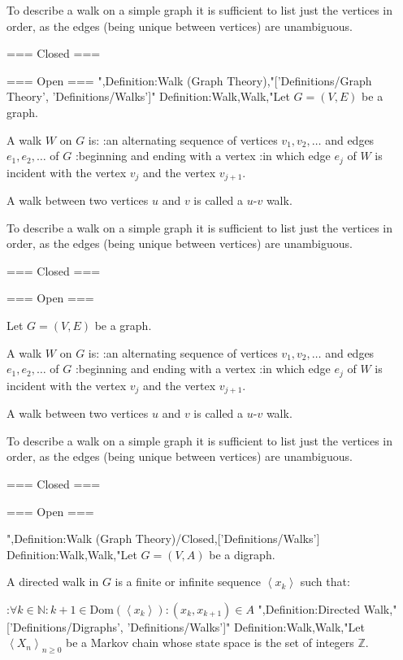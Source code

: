 To describe a walk on a simple graph it is sufficient to list just the vertices in order, as the edges (being unique between vertices) are unambiguous.


=== Closed ===

=== Open ===
",Definition:Walk (Graph Theory),"['Definitions/Graph Theory', 'Definitions/Walks']"
Definition:Walk,Walk,"Let $G = \left( V, E \right)$ be a graph.

A walk $W$ on $G$ is:
:an alternating sequence of vertices $v_1, v_2, \ldots$ and edges $e_1, e_2, \ldots$ of $G$
:beginning and ending with a vertex
:in which edge $e_j$ of $W$ is incident with the vertex $v_j$ and the vertex $v_{j + 1}$.


A walk between two vertices $u$ and $v$ is called a $u$-$v$ walk.


To describe a walk on a simple graph it is sufficient to list just the vertices in order, as the edges (being unique between vertices) are unambiguous.


=== Closed ===

=== Open ===

Let $G = \left( V, E \right)$ be a graph.

A walk $W$ on $G$ is:
:an alternating sequence of vertices $v_1, v_2, \ldots$ and edges $e_1, e_2, \ldots$ of $G$
:beginning and ending with a vertex
:in which edge $e_j$ of $W$ is incident with the vertex $v_j$ and the vertex $v_{j + 1}$.


A walk between two vertices $u$ and $v$ is called a $u$-$v$ walk.


To describe a walk on a simple graph it is sufficient to list just the vertices in order, as the edges (being unique between vertices) are unambiguous.


=== Closed ===

=== Open ===

",Definition:Walk (Graph Theory)/Closed,['Definitions/Walks']
Definition:Walk,Walk,"Let $G = \left( V, A \right)$ be a digraph.


A directed walk in $G$ is a finite or infinite sequence $\left\langle x_k \right\rangle$ such that:

:$\forall k \in \mathbb N: k + 1 \in \mathrm {Dom} \left( \left\langle x_k \right\rangle  \right): \left( x_k, x_{k + 1}  \right) \in A$
",Definition:Directed Walk,"['Definitions/Digraphs', 'Definitions/Walks']"
Definition:Walk,Walk,"Let $\left\langle X_n \right\rangle_{n \mathop \ge 0}$ be a Markov chain whose state space is the set of integers $\mathbb Z$.

